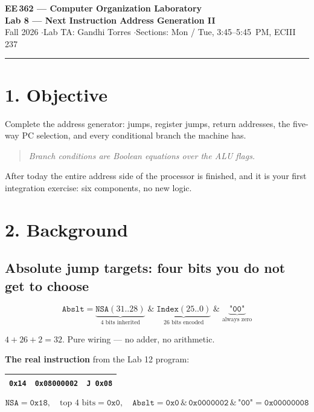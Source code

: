 \documentclass[11pt]{article}
\newcommand{\code}[1]{\texttt{#1}}
\newcommand{\hr}{\vspace{2pt}\hrule\vspace{6pt}}
\begin{document}
\begin{center}
{\Large\bfseries EE\,362 --- Computer Organization Laboratory}\\[2pt]
{\large\bfseries Lab 8 --- Next Instruction Address Generation II}\\[4pt]
Fall 2026 \quad$\cdot$\quad Lab TA: Gandhi Torres \quad$\cdot$\quad Sections: Mon / Tue, 3:45--5:45~PM, ECIII 237
\end{center}
\hr

\section*{1. Objective}

Complete the address generator: jumps, register jumps, return addresses, the
five-way PC selection, and every conditional branch the machine has.

\begin{quote}
\emph{Branch conditions are Boolean equations over the ALU flags.}
\end{quote}

After today the entire address side of the processor is finished, and it is your
first integration exercise: six components, no new logic.

\section*{2. Background}

\subsection*{Absolute jump targets: four bits you do not get to choose}

\[
\code{Abslt} = \underbrace{\code{NSA}(31..28)}_{\text{4 bits inherited}} \;\&\;
\underbrace{\code{Index}(25..0)}_{\text{26 bits encoded}} \;\&\;
\underbrace{\code{"00"}}_{\text{always zero}}
\]

$4 + 26 + 2 = 32$. Pure wiring --- no adder, no arithmetic.

\textbf{The real instruction} from the Lab 12 program:

\begin{center}
\begin{tabular}{lll}
\toprule
\code{0x14} & \code{0x08000002} & \code{J 0x08} \\
\bottomrule
\end{tabular}
\end{center}
\[
\code{NSA} = \code{0x18},\quad \text{top 4 bits} = \code{0x0},\quad
\code{Abslt} = \code{0x0}\,\&\,\code{0x0000002}\,\&\,\code{"00"} = \code{0x00000008}
\]
\end{document}
